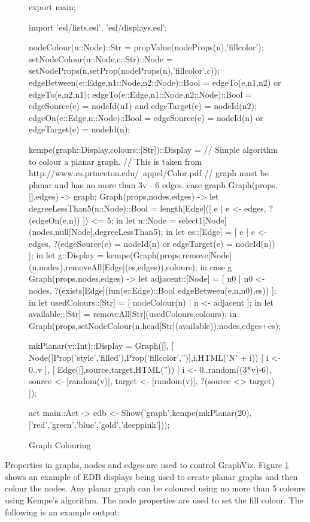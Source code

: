 \documentclass[5p,times]{elsarticle}
\begin{document}
\begin{figure}[t]
\begin{ESL}
export main;

import 'esl/lists.esl', 'esl/displays.esl';

nodeColour(n::Node)::Str = propValue(nodeProps(n),'fillcolor'); 
setNodeColour(n::Node,c::Str)::Node = setNodeProps(n,setProp(nodeProps(n),'fillcolor',c));
edgeBetween(e::Edge,n1::Node,n2::Node)::Bool = edgeTo(e,n1,n2) or edgeTo(e,n2,n1);
edgeTo(e::Edge,n1::Node,n2::Node)::Bool = edgeSource(e) = nodeId(n1) and edgeTarget(e) = nodeId(n2); 
edgeOn(e::Edge,n::Node)::Bool = edgeSource(e) = nodeId(n) or edgeTarget(e) = nodeId(n);

kempe(graph::Display,colours::[Str])::Display =
  // Simple algorithm to colour a planar graph.
  // This is taken from http://www.cs.princeton.edu/~appel/Color.pdf
  // graph must be planar and has no more than 3v - 6 edges.
  case graph {
    Graph(props,[],edges)    -> graph;
    Graph(props,nodes,edges) ->
      let degreeLessThan5(n::Node)::Bool = length[Edge]([ e | e <- edges, ?(edgeOn(e,n)) ]) <= 5; in
      let n::Node = select1[Node](nodes,null[Node],degreeLessThan5); in
      let es::[Edge] = [ e | e <- edges, ?(edgeSource(e) = nodeId(n) or edgeTarget(e) = nodeId(n)) ]; in
      let g::Display = kempe(Graph(props,remove[Node](n,nodes),removeAll[Edge](es,edges)),colours); 
      in case g {
           Graph(props,nodes,edges) ->
             let adjacent::[Node] = [ n0 | n0 <- nodes, ?(exists[Edge](fun(e::Edge)::Bool edgeBetween(e,n,n0),es)) ]; in
             let usedColours::[Str] = [ nodeColour(n) | n <- adjacent ]; in
             let available::[Str] = removeAll[Str](usedColours,colours);
             in Graph(props,setNodeColour(n,head[Str](available)):nodes,edges+es);
      }
  }

mkPlanar(v::Int)::Display = Graph([],
  [ Node([Prop('style','filled'),Prop('fillcolor','')],i,HTML('N' + i)) | i <- 0..v ],
  [ Edge([],source,target,HTML('')) | 
      i <- 0..random((3*v)-6), 
      source <- [random(v)], 
      target <- [random(v)], 
      ?(source <> target) ]);

act main::Act {} {
  -> edb <- Show('graph',kempe(mkPlanar(20),['red','green','blue','gold','deeppink']));
}
\end{ESL}
\caption{Graph Colouring}
\label{fig:graph_colouring}
\end{figure}
Properties in graphs, nodes and edges are used to control GraphViz. 
Figure \ref{fig:graph_colouring} shows an example of EDB displays being used to create planar graphs and then colour the nodes. Any planar graph can be coloured using no more than 5 colours using Kempe's algorithm. The node properties are used to set the fill colour. The following is an example output:
\end{document}
